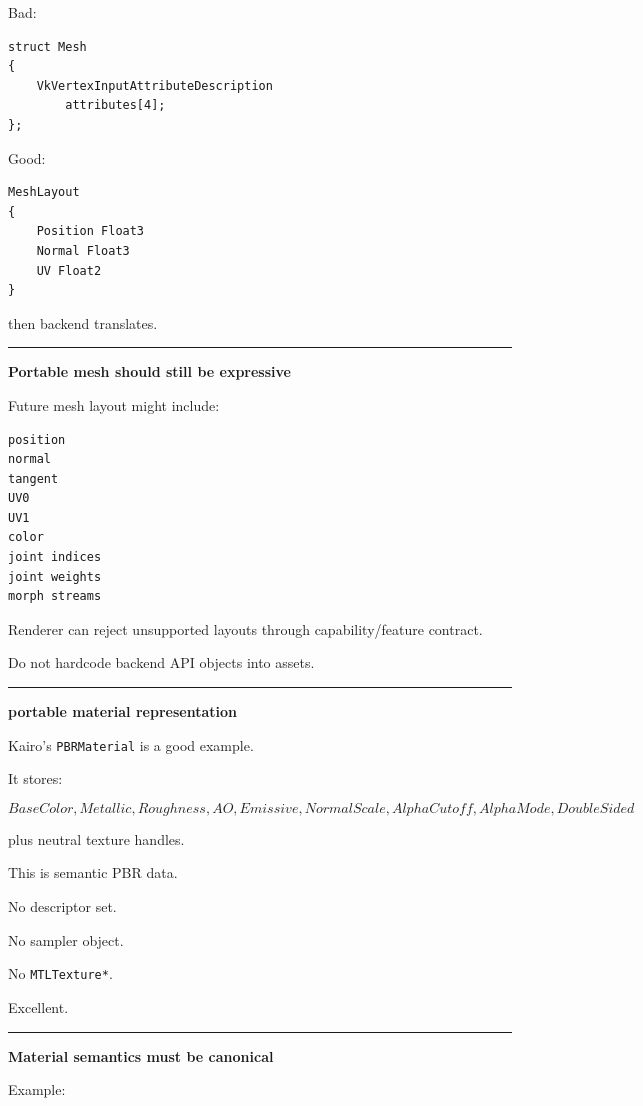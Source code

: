 Bad:

\begin{verbatim}
struct Mesh
{
    VkVertexInputAttributeDescription
        attributes[4];
};
\end{verbatim}

Good:

\begin{verbatim}
MeshLayout
{
    Position Float3
    Normal Float3
    UV Float2
}
\end{verbatim}

then backend translates.

\begin{center}\rule{0.5\linewidth}{0.5pt}\end{center}

\textbf{Portable mesh should still be expressive}

Future mesh layout might include:

\begin{verbatim}
position
normal
tangent
UV0
UV1
color
joint indices
joint weights
morph streams
\end{verbatim}

Renderer can reject unsupported layouts through capability/feature contract.

Do not hardcode backend API objects into assets.

\begin{center}\rule{0.5\linewidth}{0.5pt}\end{center}

\textbf{portable material representation}

Kairo's \texttt{PBRMaterial} is a good example.

It stores:

\[
BaseColor,
Metallic,
Roughness,
AO,
Emissive,
NormalScale,
AlphaCutoff,
AlphaMode,
DoubleSided
\]

plus neutral texture handles.

This is semantic PBR data.

No descriptor set.

No sampler object.

No \texttt{MTLTexture*}.

Excellent.

\begin{center}\rule{0.5\linewidth}{0.5pt}\end{center}

\textbf{Material semantics must be canonical}

Example:

